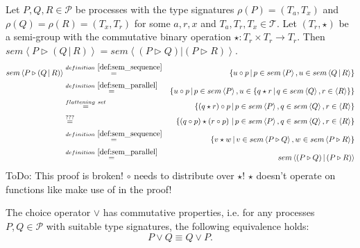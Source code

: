 \begin{myproof}
Let $P, Q, R \in \mathcal{P}$ be processes with the type signatures $\rho \left( P \right) = \left( T_a, T_x \right)$ and $\rho \left( Q \right) = \rho \left( R \right) = \left( T_x, T_r \right)$ for some $a, r, x$ and $T_a, T_r, T_x \in \mathcal{T}$. Let $\left( T_r, \star \right)$ be a semi-group with the commutative binary operation $\star \colon T_r \times T_r \to T_r$. Then $sem \left\langle P \triangleright \left( Q \,|\, R \right) \right\rangle = sem \left\langle \left( P \triangleright Q \right) | \left( P \triangleright R \right) \right\rangle$.
\begin{eqnarray*}
  sem \left\langle P \triangleright \left( Q \,|\, R \right) \right\rangle & \overset{\defref{def:sem_sequence}}{=} & \left\{ u \circ p \,|\, p \in sem \left\langle P \right\rangle, u \in sem \left\langle Q \,|\, R \right\rangle \right\} \\
  & \overset{\defref{def:sem_parallel}}{=} & \left\{ u \circ p \,|\, p \in sem \left\langle P \right\rangle, u \in \left\{q \star r \,|\, q \in sem \left\langle Q \right\rangle, r \in \left\langle R \right\rangle \right\} \right\} \\
  & \overset{flattening \ set}{=} & \left\{ \left( q \star r \right) \circ p \,|\, p \in sem \left\langle P \right\rangle, q \in sem \left\langle Q \right\rangle, r \in \left\langle R \right\rangle \right\} \\
  & \overset{???}{=} & \left\{ \left( q \circ p \right) \star \left( r \circ p \right) \,|\, p \in sem \left\langle P \right\rangle, q \in sem \left\langle Q \right\rangle, r \in \left\langle R \right\rangle \right\} \\
  & \overset{\defref{def:sem_sequence}}{=} & \left\{ v \star w \,|\, v \in sem \left\langle P \triangleright Q \right\rangle, w \in sem \left\langle P \triangleright R \right\rangle \right\} \\
  & \overset{\defref{def:sem_parallel}}{=} & sem \left\langle \left( P \triangleright Q \right) | \left( P \triangleright R \right) \right\rangle
\end{eqnarray*}
ToDo: This proof is broken! $\circ$ needs to distribute over $\star$! $\star$ doesn't operate on functions like make use of in the proof!
\end{myproof}

\begin{theorem}
\label{thm:commutativity_choice}
The choice operator $\vee$ has commutative properties, i.e. for any processes $P, Q \in \mathcal{P}$ with suitable type signatures, the following equivalence holds:
\begin{equation*}
  P \vee Q \equiv Q \vee P.
\end{equation*}
\end{theorem}

